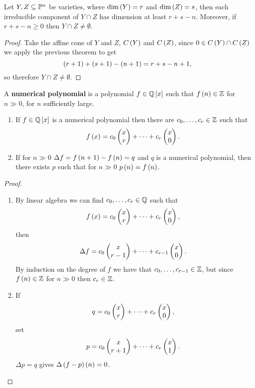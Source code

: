 \begin{theorem}
Let $ Y, Z \subseteq \P^n $ be varieties, where $ \dim\rb{Y} = r $ and $ \dim\rb{Z} = s $, then each irreducible component of $ Y \cap Z $ has dimension at least $ r + s - n $. Moreover, if $ r + s - n \ge 0 $ then $ Y \cap Z \ne \emptyset $.
\end{theorem}

\begin{proof}
Take the affine cone of $ Y $ and $ Z $, $ C\rb{Y} $ and $ C\rb{Z} $, since $ 0 \in C\rb{Y} \cap C\rb{Z} $ we apply the previous theorem to get
$$ \rb{r + 1} + \rb{s + 1} - \rb{n + 1} = r + s - n + 1, $$
so therefore $ Y \cap Z \ne \emptyset $.
\end{proof}

\begin{definition}
A \textbf{numerical polynomial} is a polynomial $ f \in \Q\sb{x} $ such that $ f\rb{n} \in \Z $ for $ n \gg 0 $, for $ n $ sufficiently large.
\end{definition}

\begin{theorem}
\hfill
\begin{enumerate}
\item If $ f \in \Q\sb{x} $ is a numerical polynomial then there are $ c_0, \dots, c_r \in \Z $ such that
$$ f\rb{x} = c_0\twobyone{x}{r} + \dots + c_r\twobyone{x}{0}. $$
\item If for $ n \gg 0 $ $ \Delta f = f\rb{n + 1} - f\rb{n} = q $ and $ q $ is a numerical polynomial, then there exists $ p $ such that for $ n \gg 0 $ $ p\rb{n} = f\rb{n} $.
\end{enumerate}
\end{theorem}

\begin{proof}
\hfill
\begin{enumerate}
\item By linear algebra we can find $ c_0, \dots, c_r \in \Q $ such that
$$ f\rb{x} = c_0\twobyone{x}{r} + \dots + c_r\twobyone{x}{0}, $$
then
$$ \Delta f = c_0\twobyone{x}{r - 1} + \dots + c_{r - 1}\twobyone{x}{0}. $$
By induction on the degree of $ f $ we have that $ c_0, \dots, c_{r - 1} \in \Z $, but since $ f\rb{n} \in \Z $ for $ n \gg 0 $ then $ c_r \in \Z $.
\item If
$$ q = c_0\twobyone{x}{r} + \dots + c_r\twobyone{x}{0}, $$
set
$$ p = c_0\twobyone{x}{r + 1} + \dots + c_r\twobyone{x}{1}. $$
$ \Delta p = q $ gives $ \Delta \rb{f - p}\rb{n} = 0 $.
\end{enumerate}
\end{proof}


